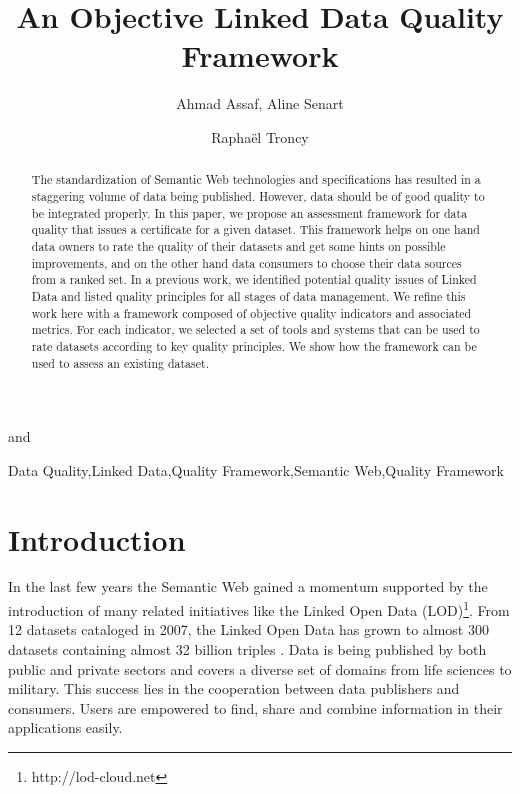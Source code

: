 \documentclass[onecolumn, crcready]{iosart2c}
\begin{document}
\begin{frontmatter}     

\title{An Objective Linked Data Quality Framework} 
\author[A]{Ahmad Assaf, Aline Senart} and
\author[B]{Raphaël Troncy} 
\address[A]{SAP Research, SAP Labs France SAS,\\
805 avenue du Dr. Maurice Donat, BP 1216, 06254 Mougins Cedex, France\\
}
\address[B]{EURECOM,\\
2229 route des cretes, 06560 Sophia Antipolis, France\\
}


\begin{abstract}
The standardization of Semantic Web technologies and specifications has resulted in a staggering volume of data being published. However, data should be of good quality to be integrated properly. In this paper, we propose an assessment framework for data quality that issues a certificate for a given dataset. This framework helps on one hand data owners to rate the quality of their datasets and get some hints on possible improvements, and on the other hand data consumers to choose their data sources from a ranked set. In a previous work, we identified potential quality issues of Linked Data and listed quality principles for all stages of data management. We refine this work here with a framework composed of objective quality indicators and associated metrics. For each indicator, we selected a set of tools and systems that can be used to rate datasets according to key quality principles. We show how the framework can be used to assess an existing dataset.
\end{abstract}
\begin{keyword}
Data Quality\sep Linked Data\sep Quality Framework\sep Semantic Web\sep Quality Framework
\end{keyword}
\end{frontmatter}

\section{Introduction}
In the last few years the Semantic Web gained a momentum supported by the introduction of many related initiatives like the Linked Open Data (LOD)\footnote{http://lod-cloud.net}. From 12 datasets cataloged in 2007, the Linked Open Data has grown to almost 300 datasets containing almost 32 billion triples \cite{bizer2011}. Data is being published by both public and private sectors and covers a diverse set of domains from life sciences to military. This success lies in the cooperation between data publishers and consumers. Users are empowered to find, share and combine information in their applications easily.
\end{document}

